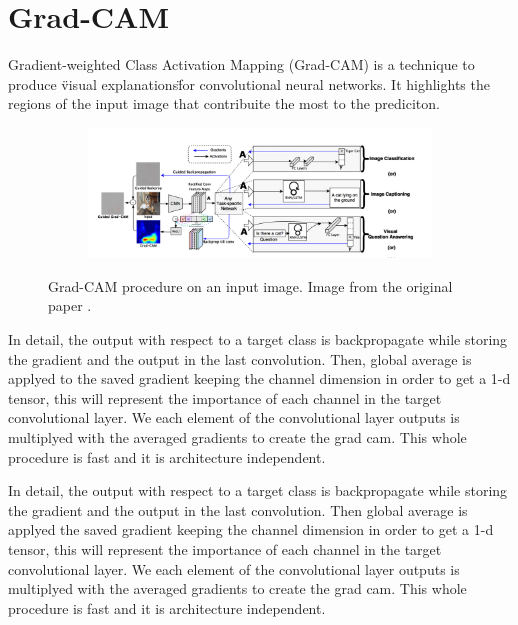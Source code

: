\documentclass[../document.tex]{subfiles}
\begin{document}
\section{Grad-CAM}
Gradient-weighted Class Activation Mapping (Grad-CAM) \cite{gradcam} is a technique to produce \"visual explanations\" for convolutional neural networks. It highlights the regions of the input image that contribuite the most to the prediciton. 
\begin{figure}[H]
    \centering
    \begin{subfigure}[b]{1\textwidth}
        \includegraphics[width=\linewidth]{../img/5/grad_cam1.png}
    \end{subfigure}
\caption{Grad-CAM procedure on an input image. Image from the original paper \cite{gradcam}.}
\end{figure}
In detail, the output with respect to a target class is backpropagate while storing the gradient and the output in the last convolution. Then, global average is applyed to the saved gradient keeping the channel dimension in order to get a 1-d tensor, this will represent the importance of each channel in the target convolutional layer. We  each element of the convolutional layer outputs is multiplyed with the averaged gradients to create the grad cam. This whole procedure is fast and it is architecture independent.

In detail, the output with respect to a target class is backpropagate while storing the gradient and the output in the last convolution. Then global average is applyed the saved gradient keeping the channel dimension in order to get a 1-d tensor, this will represent the importance of each channel in the target convolutional layer. We  each element of the convolutional layer outputs is multiplyed with the averaged gradients to create the grad cam. This whole procedure is fast and it is architecture independent.
\end{document}
